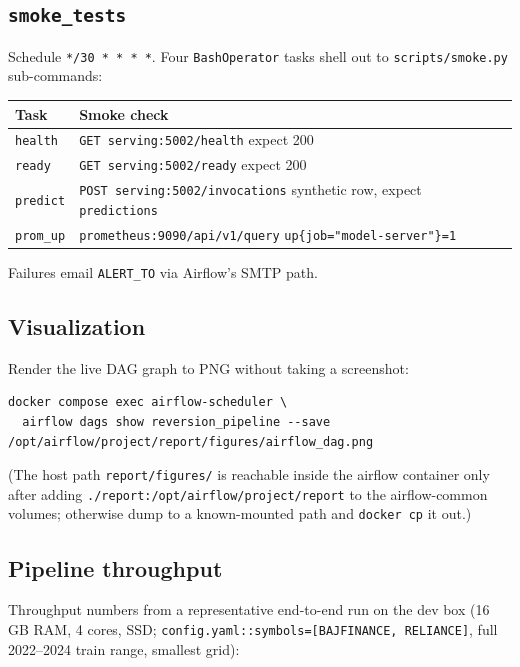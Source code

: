 \documentclass[11pt,a4paper]{article}
\begin{document}
\subsection{\texttt{smoke\_tests}}

Schedule \texttt{*/30 * * * *}. Four \texttt{BashOperator} tasks shell out to \texttt{scripts/smoke.py} sub-commands:

\begin{tabularx}{\linewidth}{@{}lX@{}}
\toprule
\textbf{Task} & \textbf{Smoke check} \\
\midrule
\texttt{health}      & \texttt{GET serving:5002/health} expect 200 \\
\texttt{ready}       & \texttt{GET serving:5002/ready} expect 200 \\
\texttt{predict}     & \texttt{POST serving:5002/invocations} synthetic row, expect \texttt{predictions} \\
\texttt{prom\_up}    & \texttt{prometheus:9090/api/v1/query} \texttt{up\{job="model-server"\}=1} \\
\bottomrule
\end{tabularx}

Failures email \texttt{ALERT\_TO} via Airflow's SMTP path.

\subsection{Visualization}

Render the live DAG graph to PNG without taking a screenshot:

\begin{lstlisting}[style=bashstyle]
docker compose exec airflow-scheduler \
  airflow dags show reversion_pipeline --save /opt/airflow/project/report/figures/airflow_dag.png
\end{lstlisting}

(The host path \texttt{report/figures/} is reachable inside the airflow container only after adding \texttt{./report:/opt/airflow/project/report} to the airflow-common volumes; otherwise dump to a known-mounted path and \texttt{docker cp} it out.)

\subsection{Pipeline throughput}\label{sec:throughput}

Throughput numbers from a representative end-to-end run on the dev box (16 GB RAM, 4 cores, SSD; \texttt{config.yaml::symbols=[BAJFINANCE, RELIANCE]}, full 2022--2024 train range, smallest grid):
\end{document}

